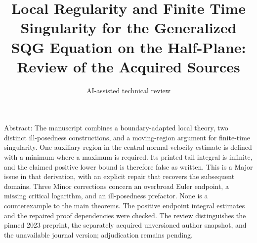 \documentclass[10pt]{article}
\title{Local Regularity and Finite Time Singularity for the Generalized SQG Equation on the Half-Plane:
Review of the Acquired Sources}
\author{AI-assisted technical review}
\date{}
\begin{document}
\maketitle
Abstract: The manuscript combines a boundary-adapted local theory, two distinct ill-posedness constructions, and a moving-region argument for finite-time singularity. One auxiliary region in the central normal-velocity estimate is defined with a minimum where a maximum is required. Its printed tail integral is infinite, and the claimed positive lower bound is therefore false as written. This is a Major issue in that derivation, with an explicit repair that recovers the subsequent domains. Three Minor corrections concern an overbroad Euler endpoint, a missing critical logarithm, and an ill-posedness prefactor. None is a counterexample to the main theorems. The positive endpoint integral estimates and the repaired proof dependencies were checked. The review distinguishes the pinned 2023 preprint, the separately acquired unversioned author snapshot, and the unavailable journal version; adjudication remains pending.\par
\end{document}
